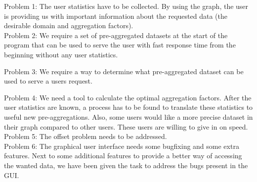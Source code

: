 Problem 1: The user statistics have to be collected.
By using the graph, the user is providing us with important information about the requested data (the desirable domain and aggregation factors).\\

Problem 2: We require a set of pre-aggregated datasets at the start of the program that can be used to serve the user with fast response time from the beginning without any user statistics.

Problem 3: We require a way to determine what pre-aggregated dataset can be used to serve a users request.


Problem 4: We need a tool to calculate the optimal aggregation factors.
After the user statistics are known, a process has to be found to translate these statistics to useful new pre-aggregations. Also, some users would like a more precise dataset in their graph compared to other users. These users are willing to give in on speed.\\

Problem 5: The offset problem needs to be addressed.\\

Problem 6: The graphical user interface needs some bugfixing and some extra features.
Next to some additional features to provide a better way of accessing the wanted data, we have been given the task to address the bugs present in the GUI.
